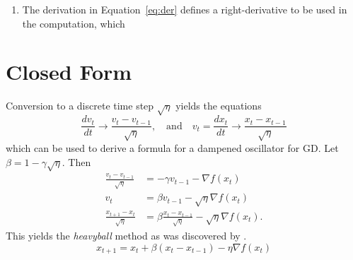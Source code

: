 \documentclass{article}
\newcommand{\dv}[2]{\frac{d #1}{d #2}}
\begin{document}
\begin{enumerate}
    \item The derivation in Equation~\ref{eq:der} defines a right-derivative to
        be used in the computation, which 
\end{enumerate}







\section{Closed Form}%
\label{sec:closed_form}

Conversion to a discrete time step $\sqrt{\eta}$ yields the equations
\begin{equation}
    \dv{v_t}{t} \rightarrow \frac{v_{t} - v_{t - 1}}{\sqrt{\eta}}, \quad \text{and}
    \quad v_{t} = \dv{x_t}{t} \rightarrow \frac{x_{t} - x_{t - 1}}{\sqrt{\eta}}
\end{equation}
which can be used to derive a formula for a dampened oscillator for GD. Let $\beta = 1 - \gamma \sqrt{\eta}$. Then 
\begin{equation}
    \begin{aligned}
        \frac{v_{t} - v_{t - 1}}{\sqrt{\eta}} &= -\gamma v_{t - 1} -\nabla
        f(x_t) \\
        v_{t} &= \beta v_{t - 1} - \sqrt{\eta} \nabla f(x_t)\\
        \frac{x_{t + 1} - x_t}{\sqrt{\eta}} &= \beta \frac{x_{t}
        - x_{t - 1}}{\sqrt{\eta}} - \sqrt{\eta} \nabla f(x_t).
    \end{aligned}
\end{equation}
This yields the \emph{heavyball} method as was discovered by
\citeauthor{heavyball}.
\begin{equation}
        x_{t + 1} = x_t + \beta (x_{t} - x_{t - 1}) - \eta \nabla f(x_t)
\end{equation}
\end{document}
